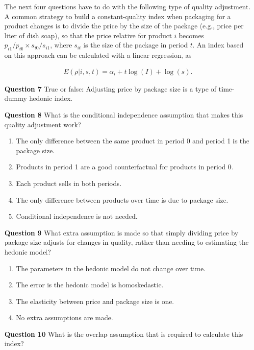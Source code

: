 \documentclass[]{article}
\begin{document}
The next four questions have to do with the following type of quality adjustment. A common strategy to build a constant-quality index when packaging for a product changes is to divide the price by the size of the package (e.g., price per liter of dish soap), so that the price relative for product \(i\) becomes \(p_{i1} / p_{i0} \times s_{i0} / s_{i1}\), where \(s_{it}\) is the size of the package in period \(t\). An index based on this approach can be calculated with a linear regression, as

\begin{align*}
E(\rho | i, s, t) = \alpha_i + t \log(I) + \log(s).
\end{align*}

\textbf{Question 7} True or false: Adjusting price by package size is a type of time-dummy hedonic index.

\textbf{Question 8} What is the conditional independence assumption that makes this quality adjustment work?

\begin{enumerate}
\def\labelenumi{\alph{enumi})}
\item
  The only difference between the same product in period 0 and period 1 is the package size.
\item
  Products in period 1 are a good counterfactual for products in period 0.
\item
  Each product sells in both periods.
\item
  The only difference between products over time is due to package size.
\item
  Conditional independence is not needed.
\end{enumerate}

\textbf{Question 9} What extra assumption is made so that simply dividing price by package size adjusts for changes in quality, rather than needing to estimating the hedonic model?

\begin{enumerate}
\def\labelenumi{\alph{enumi})}
\item
  The parameters in the hedonic model do not change over time.
\item
  The error is the hedonic model is homoskedastic.
\item
  The elasticity between price and package size is one.
\item
  No extra assumptions are made.
\end{enumerate}

\textbf{Question 10} What is the overlap assumption that is required to calculate this index?
\end{document}
